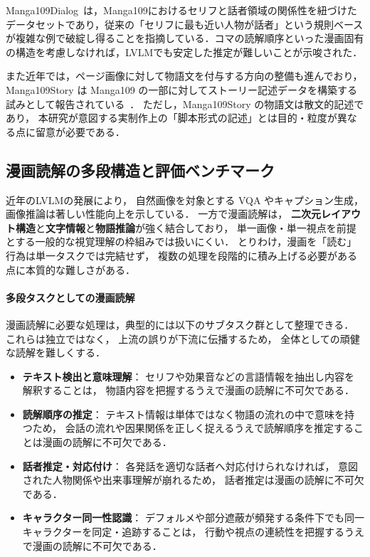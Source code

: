 \documentclass[a4j,12pt,dvipdfmx]{jsreport}
\begin{document}
Manga109Dialog~\cite{li_manga109dialog_2024}は，Manga109におけるセリフと話者領域の関係性を紐づけたデータセットであり，従来の「セリフに最も近い人物が話者」という規則ベースが複雑な例で破綻し得ることを指摘している．コマの読解順序といった漫画固有の構造を考慮しなければ，LVLMでも安定した推定が難しいことが示唆された．

また近年では，ページ画像に対して物語文を付与する方向の整備も進んでおり，
Manga109Story は Manga109 の一部に対してストーリー記述データを構築する試みとして報告されている~\cite{chen_manga_2024}．
ただし，Manga109Story の物語文は散文的記述であり，
本研究が意図する実制作上の「脚本形式の記述」とは目的・粒度が異なる点に留意が必要である．

\subsection{漫画読解の多段構造と評価ベンチマーク}
\label{sec:manga_lmms}

近年のLVLMの発展により，
自然画像を対象とする VQA やキャプション生成，画像推論は著しい性能向上を示している．
一方で漫画読解は，
\textbf{二次元レイアウト構造}と\textbf{文字情報}と\textbf{物語推論}が強く結合しており，
単一画像・単一視点を前提とする一般的な視覚理解の枠組みでは扱いにくい．
とりわけ，漫画を「読む」行為は単一タスクでは完結せず，
複数の処理を段階的に積み上げる必要がある点に本質的な難しさがある．

\vspace{0.5em}
\paragraph{多段タスクとしての漫画読解}
漫画読解に必要な処理は，典型的には以下のサブタスク群として整理できる．
これらは独立ではなく，
上流の誤りが下流に伝播するため，
全体としての頑健な読解を難しくする．

\begin{itemize}
   \item \textbf{テキスト検出と意味理解}：
         セリフや効果音などの言語情報を抽出し内容を解釈することは，
         物語内容を把握するうえで漫画の読解に不可欠である．
   \item \textbf{読解順序の推定}：
         テキスト情報は単体ではなく物語の流れの中で意味を持つため，
         会話の流れや因果関係を正しく捉えるうえで読解順序を推定することは漫画の読解に不可欠である．
   \item \textbf{話者推定・対応付け}：
         各発話を適切な話者へ対応付けられなければ，
         意図された人物関係や出来事理解が崩れるため，
         話者推定は漫画の読解に不可欠である．
   \item \textbf{キャラクター同一性認識}：
         デフォルメや部分遮蔽が頻発する条件下でも同一キャラクターを同定・追跡することは，
         行動や視点の連続性を把握するうえで漫画の読解に不可欠である．
\end{itemize}
\end{document}
